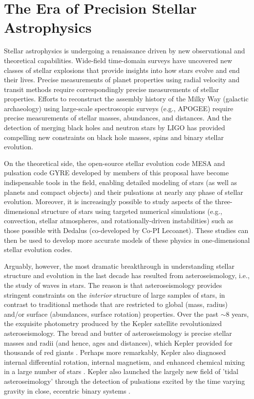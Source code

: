 \section{The Era of Precision Stellar Astrophysics}


Stellar astrophysics is undergoing a renaissance driven by new observational and theoretical capabilities. Wide-field time-domain surveys have uncovered new classes of stellar explosions that provide insights into how stars evolve and end their lives.  Precise measurements of planet properties using radial velocity and transit methods require correspondingly precise measurements of stellar properties. Efforts to reconstruct the assembly history of the Milky Way (galactic archaeology) using large-scale spectroscopic surveys (e.g., APOGEE) require precise measurements of stellar masses, abundances, and distances. And the detection of merging black holes and neutron stars by LIGO has provided compelling new constraints on black hole masses, spins and binary stellar evolution.   

On the theoretical side, the open-source stellar evolution code MESA and pulsation code GYRE developed by members of this proposal have become indispensable tools in the field, enabling detailed modeling of stars (as well as planets and compact objects) and their pulsations at nearly any phase of stellar evolution.  Moreover, it is increasingly possible to study aspects of the three-dimensional structure of stars using targeted numerical simulations (e.g., convection, stellar atmospheres, and rotationally-driven instabilities) such as those possible with Dedalus (co-developed by Co-PI Lecoanet). These studies can then be used to develop more accurate models of these physics in one-dimensional stellar evolution codes.

Arguably, however, the most dramatic breakthrough in understanding stellar structure and evolution in the last decade has resulted from asteroseismology, i.e., the study of waves in stars.  The reason is that asteroseismology provides stringent constraints on the {\em interior} structure of large samples of stars, in contrast to traditional methods that are restricted to global (mass, radius) and/or surface (abundances, surface rotation) properties. Over the past $\sim 8$ years, the exquisite photometry produced by the Kepler satellite revolutionized asteroseismology.  The bread and butter of asteroseismology is precise stellar masses and radii (and hence, ages and distances), which Kepler provided for thousands of red giants \citep{stello:13}. Perhaps more remarkably, Kepler also diagnosed internal differential rotation, internal magnetism, and enhanced chemical mixing in a large number of stars \citep{Mosser_2012,fuller:15,deheuvels:14,stello:16,moravveji:16,vanreeth:16}. {\color{green} Kepler also launched the largely new field of 'tidal asteroseimology' through the detection of pulsations excited by the time varying gravity in close, eccentric binary systems \citep{fullerkoi54:12,Burkart_2012,Fuller_2017}.}

